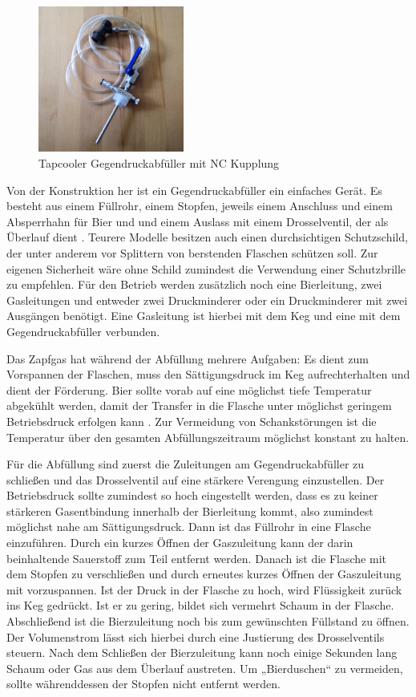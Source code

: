 \documentclass[a4paper,parskip=half]{scrartcl}
\begin{document}
\begin{figure}[h]
\centering
\includegraphics[width=4.8cm]{images/gegendruckabfuller.jpg}
\caption{Tapcooler Gegendruckabfüller mit NC Kupplung}
\label{fig:gegendruckabfuller}
\end{figure}

Von der Konstruktion her ist ein Gegendruckabfüller ein einfaches Gerät. Es besteht aus einem Füllrohr, einem Stopfen, jeweils einem Anschluss und einem Absperrhahn für Bier und  und einem Auslass mit einem Drosselventil, der als Überlauf dient \autocite{Gretzschel2016}. Teurere Modelle besitzen auch einen durchsichtigen Schutzschild, der unter anderem vor Splittern von berstenden Flaschen schützen soll. Zur eigenen Sicherheit wäre ohne Schild zumindest die Verwendung einer Schutzbrille zu empfehlen. Für den Betrieb werden zusätzlich noch eine Bierleitung, zwei Gasleitungen und entweder zwei Druckminderer oder ein Druckminderer mit zwei Ausgängen benötigt. Eine Gasleitung ist hierbei mit dem Keg und eine mit dem Gegendruckabfüller verbunden.

Das Zapfgas hat während der Abfüllung mehrere Aufgaben: Es dient zum Vorspannen der Flaschen, muss den Sättigungsdruck im Keg aufrechterhalten und dient der Förderung. Bier sollte vorab auf eine möglichst tiefe Temperatur abgekühlt werden, damit der Transfer in die Flasche unter möglichst geringem Betriebsdruck erfolgen kann \autocite{Gretzschel2016}. Zur Vermeidung von Schankstörungen ist die Temperatur über den gesamten Abfüllungszeitraum möglichst konstant zu halten.

Für die Abfüllung sind zuerst die Zuleitungen am Gegendruckabfüller zu schließen und das Drosselventil auf eine stärkere Verengung einzustellen. Der Betriebsdruck sollte zumindest so hoch eingestellt werden, dass es zu keiner stärkeren Gasentbindung innerhalb der Bierleitung kommt, also zumindest möglichst nahe am Sättigungsdruck. Dann ist das Füllrohr in eine Flasche einzuführen. Durch ein kurzes Öffnen der Gaszuleitung kann der darin beinhaltende Sauerstoff zum Teil entfernt werden. Danach ist die Flasche mit dem Stopfen zu verschließen und durch erneutes kurzes Öffnen der Gaszuleitung mit  vorzuspannen. Ist der Druck in der Flasche zu hoch, wird Flüssigkeit zurück ins Keg gedrückt. Ist er zu gering, bildet sich vermehrt Schaum in der Flasche. Abschließend ist die Bierzuleitung noch bis zum gewünschten Füllstand zu öffnen. Der Volumenstrom lässt sich hierbei durch eine Justierung des Drosselventils steuern. Nach dem Schließen der Bierzuleitung kann noch einige Sekunden lang Schaum oder Gas aus dem Überlauf austreten. Um „Bierduschen“ zu vermeiden, sollte währenddessen der Stopfen nicht entfernt werden.
\end{document}
